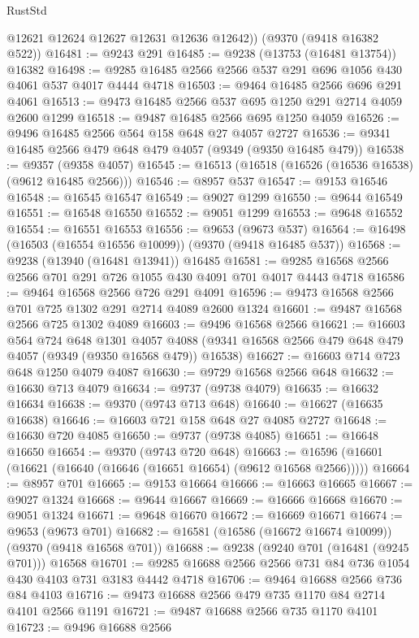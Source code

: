 \begin{lexlean}{RustStd}
\begin{coremodule}
{\begin{coremodule}
{{{{{{{{{{{{{{{{{{{{{{{{{{{{{{{{{{{{{{{        @12621
        @12624
        @12627
        @12631
        @12636
        @12642))
    (@9370 (@9418 @16382 @522))
@16481 := @9243 @291
@16485 := @9238 (@13753 (@16481 @13754)) @16382
@16498 := @9285 @16485 @2566 @2566 @537 @291 @696 @1056 @430 @4061 @537 @4017 @4444 @4718
@16503 := @9464 @16485 @2566 @696 @291 @4061
@16513 := @9473 @16485 @2566 @537 @695 @1250 @291 @2714 @4059 @2600 @1299
@16518 := @9487 @16485 @2566 @695 @1250 @4059
@16526 := @9496 @16485 @2566 @564 @158 @648 @27 @4057 @2727
@16536 := @9341 @16485 @2566 @479 @648 @479 @4057 (@9349 (@9350 @16485 @479))
@16538 := @9357 (@9358 @4057)
@16545 := @16513 (@16518 (@16526 (@16536 @16538) (@9612 @16485 @2566)))
@16546 := @8957 @537
@16547 := @9153 @16546
@16548 := @16545 @16547
@16549 := @9027 @1299
@16550 := @9644 @16549
@16551 := @16548 @16550
@16552 := @9051 @1299
@16553 := @9648 @16552
@16554 := @16551 @16553
@16556 := @9653 (@9673 @537)
@16564 := @16498 (@16503 (@16554 @16556 @10099)) (@9370 (@9418 @16485 @537))
@16568 := @9238 (@13940 (@16481 @13941)) @16485
@16581 := @9285 @16568 @2566 @2566 @701 @291 @726 @1055 @430 @4091 @701 @4017 @4443 @4718
@16586 := @9464 @16568 @2566 @726 @291 @4091
@16596 := @9473 @16568 @2566 @701 @725 @1302 @291 @2714 @4089 @2600 @1324
@16601 := @9487 @16568 @2566 @725 @1302 @4089
@16603 := @9496 @16568 @2566
@16621 := @16603
    @564
    @724
    @648
    @1301
    @4057
    @4088
    (@9341 @16568 @2566 @479 @648 @479 @4057 (@9349 (@9350 @16568 @479)) @16538)
@16627 := @16603 @714 @723 @648 @1250 @4079 @4087
@16630 := @9729 @16568 @2566 @648
@16632 := @16630 @713 @4079
@16634 := @9737 (@9738 @4079)
@16635 := @16632 @16634
@16638 := @9370 (@9743 @713 @648)
@16640 := @16627 (@16635 @16638)
@16646 := @16603 @721 @158 @648 @27 @4085 @2727
@16648 := @16630 @720 @4085
@16650 := @9737 (@9738 @4085)
@16651 := @16648 @16650
@16654 := @9370 (@9743 @720 @648)
@16663 := @16596 (@16601 (@16621 (@16640 (@16646 (@16651 @16654) (@9612 @16568 @2566)))))
@16664 := @8957 @701
@16665 := @9153 @16664
@16666 := @16663 @16665
@16667 := @9027 @1324
@16668 := @9644 @16667
@16669 := @16666 @16668
@16670 := @9051 @1324
@16671 := @9648 @16670
@16672 := @16669 @16671
@16674 := @9653 (@9673 @701)
@16682 := @16581 (@16586 (@16672 @16674 @10099)) (@9370 (@9418 @16568 @701))
@16688 := @9238 (@9240 @701 (@16481 (@9245 @701))) @16568
@16701 := @9285 @16688 @2566 @2566 @731 @84 @736 @1054 @430 @4103 @731 @3183 @4442 @4718
@16706 := @9464 @16688 @2566 @736 @84 @4103
@16716 := @9473 @16688 @2566 @479 @735 @1170 @84 @2714 @4101 @2566 @1191
@16721 := @9487 @16688 @2566 @735 @1170 @4101
@16723 := @9496 @16688 @2566
}}}}}}}}}}}}}}}}}}}}}}}}}}}}}}}}}}}}}}}
\end{coremodule}}
\end{coremodule}
\end{lexlean}
